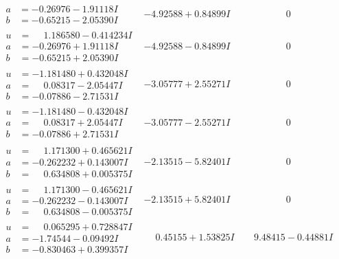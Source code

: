 \documentclass[1p]{elsarticle_modified}
\theoremstyle{definition}
\begin{document}
$$\begin{array}{c|c|c}
\begin{aligned}
a &= -0.26976 - 1.91118 I \\
b &= -0.65215 - 2.05390 I\end{aligned}
 & -4.92588 + 0.84899 I & \phantom{-0.000000 } 0 \\ \hline\begin{aligned}
u &= \phantom{-}1.186580 - 0.414234 I \\
a &= -0.26976 + 1.91118 I \\
b &= -0.65215 + 2.05390 I\end{aligned}
 & -4.92588 - 0.84899 I & \phantom{-0.000000 } 0 \\ \hline\begin{aligned}
u &= -1.181480 + 0.432048 I \\
a &= \phantom{-}0.08317 - 2.05447 I \\
b &= -0.07886 - 2.71531 I\end{aligned}
 & -3.05777 + 2.55271 I & \phantom{-0.000000 } 0 \\ \hline\begin{aligned}
u &= -1.181480 - 0.432048 I \\
a &= \phantom{-}0.08317 + 2.05447 I \\
b &= -0.07886 + 2.71531 I\end{aligned}
 & -3.05777 - 2.55271 I & \phantom{-0.000000 } 0 \\ \hline\begin{aligned}
u &= \phantom{-}1.171300 + 0.465621 I \\
a &= -0.262232 + 0.143007 I \\
b &= \phantom{-}0.634808 + 0.005375 I\end{aligned}
 & -2.13515 - 5.82401 I & \phantom{-0.000000 } 0 \\ \hline\begin{aligned}
u &= \phantom{-}1.171300 - 0.465621 I \\
a &= -0.262232 - 0.143007 I \\
b &= \phantom{-}0.634808 - 0.005375 I\end{aligned}
 & -2.13515 + 5.82401 I & \phantom{-0.000000 } 0 \\ \hline\begin{aligned}
u &= \phantom{-}0.065295 + 0.728847 I \\
a &= -1.74544 - 0.09492 I \\
b &= -0.830463 + 0.399357 I\end{aligned}
 & \phantom{-}0.45155 + 1.53825 I & \phantom{-}9.48415 - 0.44881 I \\ \hline\begin{aligned}

\end{aligned}
\end{array}$$
\end{document}
